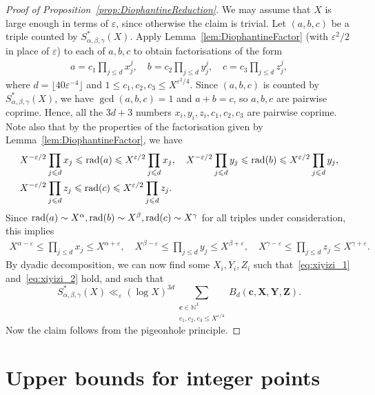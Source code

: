 \begin{proof}[Proof of Proposition~\ref{prop:DiophantineReduction}]
  We may assume that $X$ is large enough in terms of $\varepsilon$, since otherwise the claim is trivial. Let $(a,b,c)$ be a triple counted by $S^*_{\alpha,\beta,\gamma}(X)$. Apply Lemma~\ref{lem:DiophantineFactor} (with $\varepsilon^2/2$ in place of $\varepsilon$) to each of $a,b,c$ to obtain factorisations of the form
\begin{align*}
a=c_1\prod_{j\leq d}x_j^j,\quad b=c_2\prod_{j\leq d}y_j^j,\quad c=c_3\prod_{j\leq d}z_j^j,
\end{align*}
where $d=\lfloor 40\varepsilon^{-4}\rfloor$ and $1\leq c_1,c_2,c_3\leq X^{\varepsilon^2/4}$. Since $(a,b,c)$ is counted by $S^*_{\alpha,\beta,\gamma}(X)$, we have $\gcd(a,b,c)=1$ and $a+b=c$, so $a,b,c$ are pairwise coprime. Hence, all the $3d+3$ numbers $x_i,y_i,z_i,c_1,c_2,c_3$ are pairwise coprime. Note also that by the properties of the factorisation given by Lemma~\ref{lem:DiophantineFactor}, we have
\begin{align*}
&X^{-\varepsilon/2}\prod_{j\leqslant d}x_j\leqslant \operatorname{rad}(a)\leqslant X^{\varepsilon/2}\prod_{j\leqslant d}x_j,\quad X^{-\varepsilon/2}\prod_{j\leqslant d}y_j\leqslant \operatorname{rad}(b)\leqslant X^{\varepsilon/2}\prod_{j\leqslant d}y_j,\\
&X^{-\varepsilon/2}\prod_{j\leqslant d}z_j\leqslant \operatorname{rad}(c)\leqslant X^{\varepsilon/2}\prod_{j\leqslant d}z_j.
\end{align*}
Since $\operatorname{rad}(a)\sim X^{\alpha},\operatorname{rad}(b)\sim X^{\beta},\operatorname{rad}(c)\sim X^{\gamma}$ for all triples under consideration, this implies
\begin{align*}
X^{\alpha-\varepsilon}\leq \prod_{j\leq d}x_j\leq X^{\alpha+\varepsilon},\quad X^{\beta-\varepsilon}\leq \prod_{j\leq d}y_j\leq X^{\beta+\varepsilon},\quad X^{\gamma-\varepsilon}\leq \prod_{j\leq d}z_j\leq X^{\gamma+\varepsilon}.
\end{align*}
By dyadic decomposition, we can now find some $X_i, Y_i,Z_i$ such that~\eqref{eq:xiyizi_1}
and~\eqref{eq:xiyizi_2}
 hold, and such that
\[
S^*_{\alpha,\beta,\gamma}(X)\ll_{\varepsilon} (\log X)^{3d} \sum_{\substack{\mathbf{c}\in \mathbb{N}^3\\
c_1,c_2,c_3
\leq X^{\varepsilon/4}}}B_d(\mathbf{c},\mathbf{X},\mathbf{Y},\mathbf{Z}).
\]
Now the claim follows from the pigeonhole principle.
\end{proof}



\chapter{Upper bounds for integer points}

